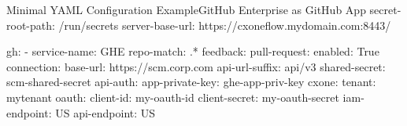 \begin{code}{Minimal YAML Configuration Example}{GitHub Enterprise as GitHub App}{}
secret-root-path: /run/secrets
server-base-url: https://cxoneflow.mydomain.com:8443/

gh:
    - service-name: GHE
      repo-match: .*
      feedback:
        pull-request:
          enabled: True
      connection:
        base-url: https://scm.corp.com
        api-url-suffix: api/v3
        shared-secret: scm-shared-secret
        api-auth:
          app-private-key: ghe-app-priv-key
      cxone:
        tenant: mytenant
        oauth:
          client-id: my-oauth-id
          client-secret: my-oauth-secret
        iam-endpoint: US
        api-endpoint: US
\end{code}
